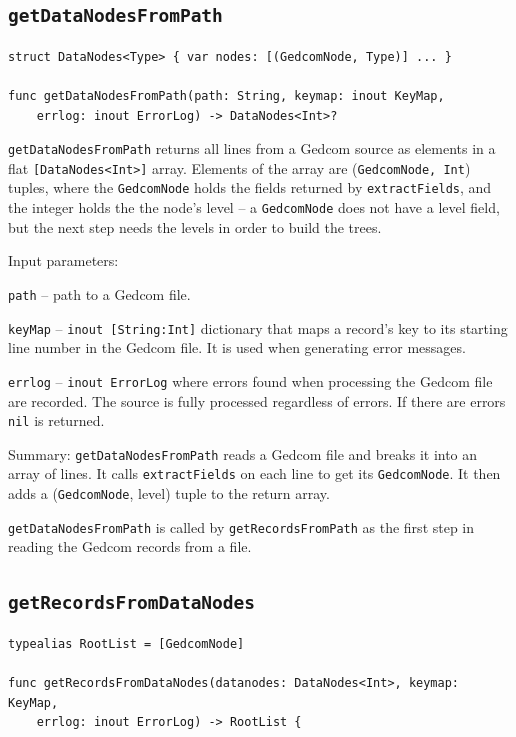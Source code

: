 %
%

\subsection{\texttt{getDataNodesFromPath}}
\begin{verbatim}
struct DataNodes<Type> { var nodes: [(GedcomNode, Type)] ... }
 
func getDataNodesFromPath(path: String, keymap: inout KeyMap,
    errlog: inout ErrorLog) -> DataNodes<Int>?
\end{verbatim}

\texttt{getDataNodesFromPath} returns all lines from a Gedcom source as
elements in a flat
\texttt{[DataNodes<Int>]} array.
Elements of the array are (\texttt{GedcomNode,~Int}) tuples, where the
\texttt{GedcomNode}
holds the fields returned by \texttt{extractFields}, and the integer holds
the the node's level -- a
\texttt{GedcomNode} does not have a level field, but the next step needs
the levels in order to build the trees.

Input parameters:

\texttt{path} -- path to a Gedcom file.

\texttt{keyMap} -- \texttt{inout [String:Int]} dictionary that maps
a record's key to its starting line number in the Gedcom file.
It is used when generating error messages.

\texttt{errlog} -- \texttt{inout ErrorLog} where errors found when
processing the Gedcom file are recorded. The source is fully processed regardless of errors.
If there are errors \texttt{nil} is returned.

Summary: \texttt{getDataNodesFromPath} reads a Gedcom file and breaks it
into an array of lines.
It calls \texttt{extractFields} on each line to get its \texttt{GedcomNode}.
It then adds a (\texttt{GedcomNode}, level)
tuple to the return array.

\texttt{getDataNodesFromPath} is called by \texttt{getRecordsFromPath} as
the first step in reading the Gedcom records from a file.

%
%

\subsection{\texttt{getRecordsFromDataNodes}}
\begin{verbatim}
typealias RootList = [GedcomNode]

func getRecordsFromDataNodes(datanodes: DataNodes<Int>, keymap: KeyMap,
    errlog: inout ErrorLog) -> RootList {
\end{verbatim}

